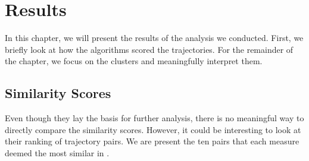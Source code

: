 \chapter{Results}
\label{ch:6}

In this chapter, we will present the results of the analysis we conducted.
First, we briefly look at how the algorithms scored the trajectories. 
For the remainder of the chapter, we focus on the clusters and meaningfully interpret them. 



\section{Similarity Scores}
Even though they lay the basis for further analysis, there is no meaningful way to directly compare the similarity scores. 
However, it could be interesting to look at their ranking of trajectory pairs. 
We are present the ten pairs that each measure deemed the most similar in . 

